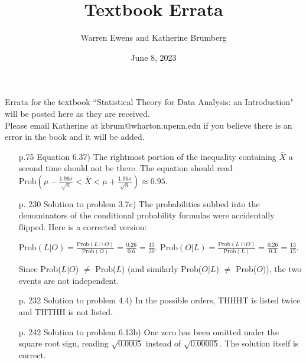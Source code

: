 \documentclass{article}
\title{Textbook Errata}
\author{Warren Ewens and Katherine Brumberg}
\date{June 8, 2023}
\begin{document}
\maketitle

\noindent Errata for the textbook ``Statistical Theory for Data Analysis: an Introduction" will be posted here as they are received. \\

\noindent Please email Katherine at kbrum@wharton.upenn.edu if you believe there is an error in the book and it will be added.


\begin{enumerate}

\item[p.75] Equation 6.37) The rightmost portion of the inequality containing $\bar{X}$ a second time should not be there. The equation should read $\text{Prob}(\mu - \frac{1.96\sigma}{\sqrt{n}} < \bar{X} < \mu + \frac{1.96\sigma}{\sqrt{n}}) \approx 0.95$.

\item[p. 230]  Solution to problem 3.7c) The probabilities subbed into the denominators of the conditional probability formulas were accidentally flipped. Here is a corrected version:

$\text{Prob}(L | O) = \frac{\text{Prob}(L\cap O)}{\text{Prob}(O)} = \frac{0.26}{0.6} = \frac{13}{30}.$
$\text{Prob}(O | L) = \frac{\text{Prob}(L\cap O)}{\text{Prob}(L)} = \frac{0.26}{0.3} =  \frac{13}{15}.$\smallskip

Since Prob($L | O$) $\neq$ Prob($L$) (and similarly Prob($O | L$) $\neq$ Prob($O$)), the two events are not independent.

\item[p. 232] Solution to problem 4.4) In the possible orders, THHHT is listed twice and THTHH is not listed.

\item[p. 242] Solution to problem 6.13b) One zero has been omitted under the square root sign, reading $\sqrt{0.0005}$ instead of $\sqrt{0.00005}$. The solution itself is correct.

\end{enumerate}
\end{document}
